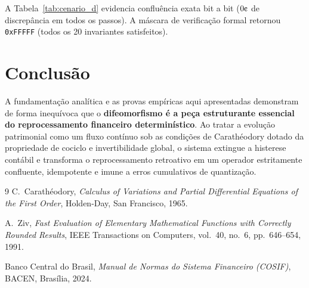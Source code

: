\documentclass[11pt,a4paper]{article}
\theoremstyle{definition}
\theoremstyle{remark}
\begin{document}
A Tabela~\ref{tab:cenario_d} evidencia confluência exata bit a bit ($0\text{\textcent}$ de discrepância em todos os passos). A máscara de verificação formal retornou \texttt{0xFFFFF} (todos os 20 invariantes satisfeitos).

\section{Conclusão}

A fundamentação analítica e as provas empíricas aqui apresentadas demonstram de forma inequívoca que o \textbf{difeomorfismo é a peça estruturante essencial do reprocessamento financeiro determinístico}. Ao tratar a evolução patrimonial como um fluxo contínuo sob as condições de Carathéodory dotado da propriedade de cociclo e invertibilidade global, o sistema extingue a histerese contábil e transforma o reprocessamento retroativo em um operador estritamente confluente, idempotente e imune a erros cumulativos de quantização.

\begin{thebibliography}{9}
C.~Carathéodory,
\emph{Calculus of Variations and Partial Differential Equations of the First Order},
Holden-Day, San Francisco, 1965.

A.~Ziv,
\emph{Fast Evaluation of Elementary Mathematical Functions with Correctly Rounded Results},
IEEE Transactions on Computers, vol.~40, no.~6, pp.~646--654, 1991.

Banco Central do Brasil,
\emph{Manual de Normas do Sistema Financeiro (COSIF)},
BACEN, Brasília, 2024.
\end{thebibliography}
\end{document}
